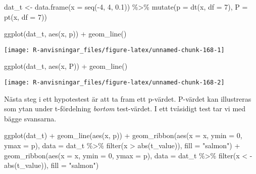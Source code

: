 \documentclass[
]{book}
\newenvironment{Shaded}{\begin{snugshade}}{\end{snugshade}}
\newcommand{\AttributeTok}[1]{\textcolor[rgb]{0.77,0.63,0.00}{#1}}
\newcommand{\DecValTok}[1]{\textcolor[rgb]{0.00,0.00,0.81}{#1}}
\newcommand{\FloatTok}[1]{\textcolor[rgb]{0.00,0.00,0.81}{#1}}
\newcommand{\FunctionTok}[1]{\textcolor[rgb]{0.00,0.00,0.00}{#1}}
\newcommand{\NormalTok}[1]{#1}
\newcommand{\OtherTok}[1]{\textcolor[rgb]{0.56,0.35,0.01}{#1}}
\newcommand{\SpecialCharTok}[1]{\textcolor[rgb]{0.00,0.00,0.00}{#1}}
\newcommand{\StringTok}[1]{\textcolor[rgb]{0.31,0.60,0.02}{#1}}
\theoremstyle{definition}
\theoremstyle{definition}
\theoremstyle{definition}
\theoremstyle{definition}
\theoremstyle{remark}
\begin{document}
\begin{Shaded}
\begin{Highlighting}[]
\NormalTok{dat\_t }\OtherTok{\textless{}{-}} \FunctionTok{data.frame}\NormalTok{(}\AttributeTok{x =} \FunctionTok{seq}\NormalTok{(}\SpecialCharTok{{-}}\DecValTok{4}\NormalTok{, }\DecValTok{4}\NormalTok{, }\FloatTok{0.1}\NormalTok{)) }\SpecialCharTok{\%\textgreater{}\%} 
  \FunctionTok{mutate}\NormalTok{(}\AttributeTok{p =} \FunctionTok{dt}\NormalTok{(x, }\AttributeTok{df =} \DecValTok{7}\NormalTok{),}
         \AttributeTok{P =} \FunctionTok{pt}\NormalTok{(x, }\AttributeTok{df =} \DecValTok{7}\NormalTok{))}

\FunctionTok{ggplot}\NormalTok{(dat\_t, }\FunctionTok{aes}\NormalTok{(x, p)) }\SpecialCharTok{+}
  \FunctionTok{geom\_line}\NormalTok{()}
\end{Highlighting}
\end{Shaded}

\begin{center}\texttt{[image: R-anvisningar\_files/figure-latex/unnamed-chunk-168-1]} \end{center}

\begin{Shaded}
\begin{Highlighting}[]
\FunctionTok{ggplot}\NormalTok{(dat\_t, }\FunctionTok{aes}\NormalTok{(x, P)) }\SpecialCharTok{+}
  \FunctionTok{geom\_line}\NormalTok{()}
\end{Highlighting}
\end{Shaded}

\begin{center}\texttt{[image: R-anvisningar\_files/figure-latex/unnamed-chunk-168-2]} \end{center}

Nästa steg i ett hypotestest är att ta fram ett p-värdet. P-värdet kan illustreras som ytan under t-fördelning \emph{bortom} test-värdet. I ett tvåsidigt test tar vi med bägge svansarna.

\begin{Shaded}
\begin{Highlighting}[]
\FunctionTok{ggplot}\NormalTok{(dat\_t) }\SpecialCharTok{+}
  \FunctionTok{geom\_line}\NormalTok{(}\FunctionTok{aes}\NormalTok{(x, p)) }\SpecialCharTok{+}
  \FunctionTok{geom\_ribbon}\NormalTok{(}\FunctionTok{aes}\NormalTok{(}\AttributeTok{x =}\NormalTok{ x, }\AttributeTok{ymin =} \DecValTok{0}\NormalTok{, }\AttributeTok{ymax =}\NormalTok{ p), }\AttributeTok{data =}\NormalTok{ dat\_t }\SpecialCharTok{\%\textgreater{}\%} \FunctionTok{filter}\NormalTok{(x }\SpecialCharTok{\textgreater{}} \FunctionTok{abs}\NormalTok{(t\_value)), }\AttributeTok{fill =} \StringTok{"salmon"}\NormalTok{) }\SpecialCharTok{+}
  \FunctionTok{geom\_ribbon}\NormalTok{(}\FunctionTok{aes}\NormalTok{(}\AttributeTok{x =}\NormalTok{ x, }\AttributeTok{ymin =} \DecValTok{0}\NormalTok{, }\AttributeTok{ymax =}\NormalTok{ p), }\AttributeTok{data =}\NormalTok{ dat\_t }\SpecialCharTok{\%\textgreater{}\%} \FunctionTok{filter}\NormalTok{(x }\SpecialCharTok{\textless{}} \SpecialCharTok{{-}}\FunctionTok{abs}\NormalTok{(t\_value)), }\AttributeTok{fill =} \StringTok{"salmon"}\NormalTok{)}
\end{Highlighting}
\end{Shaded}
\end{document}
